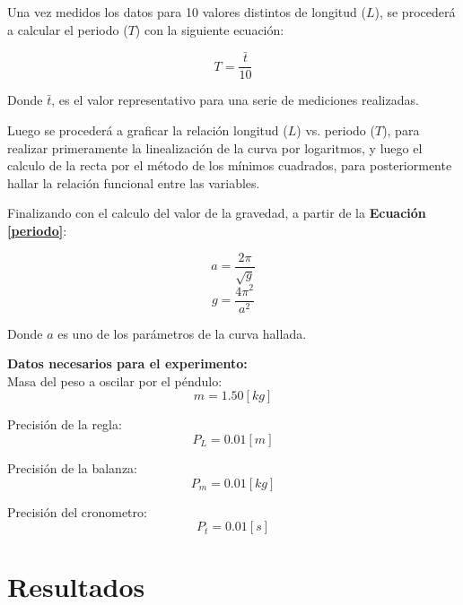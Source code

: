 \documentclass[letter,11pt]{article}
\begin{document}
Una vez medidos los datos para 10 valores distintos de longitud ($L$), se
procederá a calcular el periodo ($T$) con la siguiente ecuación:

\begin{equation}
    T = \frac{\bar{t}}{10}
\label{periodo10}
\end{equation}
\vspace{0.10cm}

Donde $\bar{t}$, es el valor representativo para una serie de mediciones
realizadas.

Luego se procederá a graficar la relación longitud ($L$) vs. periodo ($T$), para
realizar primeramente la linealización de la curva por logaritmos, y luego el
calculo de la recta por el método de los mínimos cuadrados, para posteriormente
hallar la relación funcional entre las variables.

Finalizando con el calculo del valor de la gravedad, a partir de la
\textbf{Ecuación \ref{periodo}}:

\begin{equation*}
    a = \frac{2 \pi}{\sqrt{g}}
\end{equation*}
\begin{equation}
    g = \frac{4 \pi^2}{a^2}
\label{gravedad}
\end{equation}
\vspace{0.10cm}

Donde $a$ es uno de los parámetros de la curva hallada.

\vspace{0.35cm}
\textbf{Datos necesarios para el experimento:} \\

Masa del peso a oscilar por el péndulo:
\begin{equation*}
    m = 1.50 [kg]
\end{equation*}

Precisión de la regla:
\begin{equation*}
    P_L = 0.01 [m]
\end{equation*}

Precisión de la balanza:
\begin{equation*}
    P_m = 0.01 [kg]
\end{equation*}

Precisión del cronometro:
\begin{equation*}
    P_t = 0.01 [s]
\end{equation*}

\section{Resultados}
\end{document}
